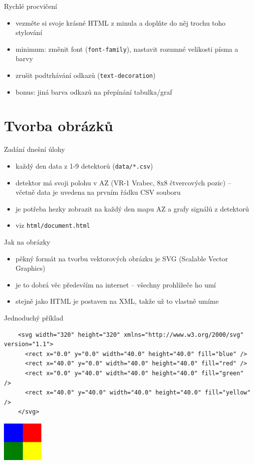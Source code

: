 \documentclass{beamer}
\begin{document}
\begin{frame}{Rychlé procvičení}
  \begin{itemize}
    \item vezměte si svoje krásné HTML z minula a doplňte do něj trochu toho stylování
    \item minimum: změnit font (\texttt{font-family}), nastavit rozumné velikosti písma a barvy
    \item zrušit podtrhávání odkazů (\texttt{text-decoration})
    \item bonus: jiná barva odkazů na přepínání tabulka/graf
  \end{itemize}
\end{frame}

\section{Tvorba obrázků}

\begin{frame}{Zadání dnešní úlohy}
  \begin{itemize}
    \item každý den data z 1-9 detektorů (\texttt{data/*.csv})
    \item detektor má svoji polohu v AZ (VR-1 Vrabec, 8x8 čtvercových pozic) -- včetně data je uvedena na prvním řádku CSV souboru
    \item je potřeba hezky zobrazit na každý den mapu AZ a grafy signálů z detektorů
    \item viz \texttt{html/document.html}
  \end{itemize}
\end{frame}

\begin{frame}{Jak na obrázky}
  \begin{itemize}
    \item pěkný formát na tvorbu vektorových obrázku je SVG (Scalable Vector Graphics)
    \item je to dobrá věc především na internet -- všechny prohlížeče ho umí
    \item stejně jako HTML je postaven na XML, takže už to vlastně umíme
  \end{itemize}
\end{frame}

\begin{frame}[fragile]{Jednoduchý příklad}
  \tiny
  \begin{verbatim}
    <svg width="320" height="320" xmlns="http://www.w3.org/2000/svg" version="1.1">
      <rect x="0.0" y="0.0" width="40.0" height="40.0" fill="blue" />
      <rect x="40.0" y="0.0" width="40.0" height="40.0" fill="red" />
      <rect x="0.0" y="40.0" width="40.0" height="40.0" fill="green" />
      <rect x="40.0" y="40.0" width="40.0" height="40.0" fill="yellow" />
    </svg>
  \end{verbatim}
  \includegraphics[width=0.15\textwidth]{example}
\end{frame}
\end{document}
